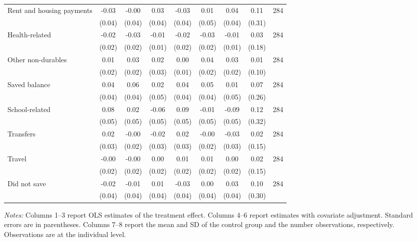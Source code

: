 \begin{table}[h]
{\begin{threeparttable}
\begin{tabular}{l*{8}{c}}
Rent and housing payments&    -0.03&    -0.00&     0.03&    -0.03&     0.01&     0.04&     0.11&      284\\
          &   (0.04)&   (0.04)&   (0.04)&   (0.04)&   (0.05)&   (0.04)&   (0.31)&         \\
Health-related&    -0.02&    -0.03&    -0.01&    -0.02&    -0.03&    -0.01&     0.03&      284\\
          &   (0.02)&   (0.02)&   (0.01)&   (0.02)&   (0.02)&   (0.01)&   (0.18)&         \\
Other non-durables&     0.01&     0.03&     0.02&     0.00&     0.04&     0.03&     0.01&      284\\
          &   (0.02)&   (0.02)&   (0.03)&   (0.01)&   (0.02)&   (0.02)&   (0.10)&         \\
Saved balance&     0.04&     0.06&     0.02&     0.04&     0.05&     0.01&     0.07&      284\\
          &   (0.04)&   (0.04)&   (0.05)&   (0.04)&   (0.04)&   (0.05)&   (0.26)&         \\
School-related&     0.08&     0.02&    -0.06&     0.09&    -0.01&    -0.09&     0.12&      284\\
          &   (0.05)&   (0.05)&   (0.05)&   (0.05)&   (0.05)&   (0.05)&   (0.32)&         \\
Transfers &     0.02&    -0.00&    -0.02&     0.02&    -0.00&    -0.03&     0.02&      284\\
          &   (0.03)&   (0.02)&   (0.03)&   (0.03)&   (0.02)&   (0.03)&   (0.15)&         \\
Travel    &    -0.00&    -0.00&     0.00&     0.01&     0.01&     0.00&     0.02&      284\\
          &   (0.02)&   (0.02)&   (0.02)&   (0.02)&   (0.02)&   (0.02)&   (0.15)&         \\
Did not save&    -0.02&    -0.01&     0.01&    -0.03&     0.00&     0.03&     0.10&      284\\
          &   (0.04)&   (0.04)&   (0.04)&   (0.04)&   (0.04)&   (0.04)&   (0.30)&         \\
\bottomrule \end{tabular} \begin{tablenotes}[flushleft] \footnotesize \item \emph{Notes:} Columns 1--3 report OLS estimates of the treatment effect. Columns 4--6 report estimates with covariate adjustment. Standard errors are in parentheses. Columns 7--8 report the mean and SD of the control group and the number observations, respectively. Observations are at the individual level. \end{tablenotes} \end{threeparttable} } \end{table}

